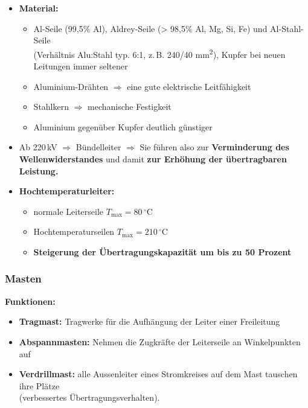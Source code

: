     \vspace{1em}
    \begin{itemize}
        \item \textbf{Material:}
        \begin{itemize}
            \item Al-Seile (99{,}5\% Al), Aldrey-Seile (> 98{,}5\% Al, Mg, Si, Fe) und Al-Stahl-Seile\\ 
            (Verhältnis Alu:Stahl typ. 6:1, z.\,B. 240/40 mm\textsuperscript{2}), Kupfer bei neuen Leitungen immer seltener
            \item Aluminium-Drähten $\Rightarrow$ eine gute elektrische Leitfähigkeit
            \item Stahlkern $\Rightarrow$ mechanische Festigkeit
            \item Aluminium gegenüber Kupfer deutlich günstiger
        \end{itemize}

        \item Ab 220\,kV $\Rightarrow$ Bündelleiter $\Rightarrow$ Sie führen also zur 
        \textbf{Verminderung des Wellenwiderstandes} und damit 
        \textbf{zur Erhöhung der übertragbaren Leistung.}

        \item \textbf{Hochtemperaturleiter:}
        \begin{itemize}
            \item normale Leiterseile $T_{\text{max}} = 80\,^{\circ}\mathrm{C}$
            \item Hochtemperaturseilen $T_{\text{max}} = 210\,^{\circ}\mathrm{C}$
            \item \textbf{Steigerung der Übertragungskapazität um bis zu 50 Prozent}
        \end{itemize}
    \end{itemize}

\subsubsection{Masten}
    \textbf{Funktionen:}
    \begin{itemize}
        \item \textbf{Tragmast:} Tragwerke für die Aufhängung der Leiter einer Freileitung
        \item \textbf{Abspannmasten:} Nehmen die Zugkräfte der Leiterseile an Winkelpunkten auf
        \item \textbf{Verdrillmast:} alle Aussenleiter eines Stromkreises auf dem Mast tauschen ihre Plätze\\
        (verbessertes Übertragungsverhalten).
    \end{itemize}

